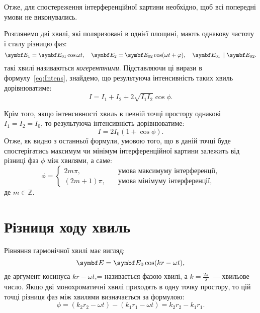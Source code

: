 Отже, для спостереження інтерференційної картини необхідно, щоб всі попередні умови не виконувались.

Розглянемо дві хвилі, які поляризовані в однієї площині, мають однакову частоту і сталу різницю фаз:
\begin{equation}\label{eq:CogEField}
    \vect{E}_1 = \vect{E}_{01}\cos\omega t, \quad \vect{E}_2 = \vect{E}_{02}\cos(\omega t + \phi), \quad \vect{E}_{01} \parallel \vect{E}_{02}.
\end{equation}
такі хвилі називаються \emph{когерентними}. Підставляючи ці вирази в формулу~\eqref{eq:Intens}, знайдемо, що результуюча інтенсивність таких хвиль дорівнюватиме:
\begin{equation}\label{key}
    I = I_1 + I_2 + 2\sqrt{I_1I_2}\cos\phi.
\end{equation}

Крім того, якщо інтенсивності хвиль в певній точці простору однакові $I_1 = I_2 = I_0$, то результуюча інтенсивність дорівнюватиме:
\begin{equation}
    I = 2I_0\left(1+ \cos\phi \right) .
\end{equation}
Отже, як видно з останньої формули, умовою того, що в даній точці буде спостерігатись максимум чи мінімум інтерференційної картини залежить від різниці фаз $\phi$ між хвилями, а саме:
\begin{equation}\label{eq:InterferenceCondition}
    \phi=
    \begin{cases}
        2 m \pi, &\quad \text{умова максимуму інтерференції}, \\
        \left( 2m + 1 \right) \pi , &\quad\text{умова мінімуму інтерференції},
    \end{cases}
\end{equation}
де $m \in \mathbb{Z}$.

\section{Різниця ходу хвиль}

Рівняння гармонічної хвилі має вигляд:
\[
    \vect{E} = \vect{E}_{0}\cos(k r - \omega t),
\]
де аргумент косинуса $ k r - \omega t $,= називається фазою хвилі, а $k = \frac{2\pi}{\lambda}$~--- хвильове число.  Якщо дві монохроматичні хвилі приходять в одну точку простору, то цій точці різниця фаз між хвилями визначається за формулою:
\[
    \phi = ( k_2 r_2 - \omega t) - ( k_1 r_1 - \omega t) = k_2 r_2 - k_1 r_1.
\]

